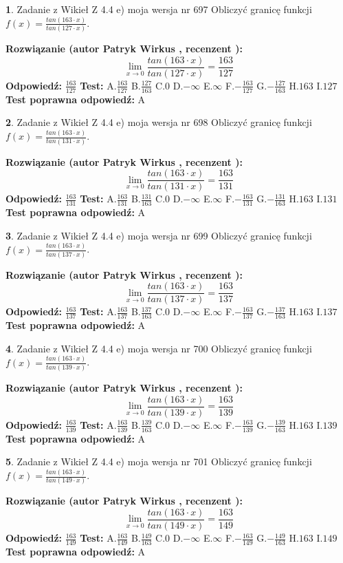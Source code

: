 \documentclass[12pt, a4paper]{article}
\theoremstyle{definition} %
\newtheorem{zad}{}
\newcommand{\zadStart}[1]{\begin{zad}#1\newline}
\newcommand{\zadStop}{\end{zad}}
\newcommand{\rozwStart}[2]{\noindent \textbf{Rozwiązanie (autor #1 , recenzent #2): }\newline}
\newcommand{\rozwStop}{\newline}
\newcommand{\odpStart}{\noindent \textbf{Odpowiedź:}\newline}
\newcommand{\odpStop}{\newline}
\newcommand{\testStart}{\noindent \textbf{Test:}\newline}
\newcommand{\testStop}{\newline}
\newcommand{\kluczStart}{\noindent \textbf{Test poprawna odpowiedź:}\newline}
\newcommand{\kluczStop}{\newline}
\begin{document}
\zadStart{Zadanie z Wikieł Z 4.4 e) moja wersja nr 697}
Obliczyć granicę funkcji $f(x)=\frac{tan(163\cdot x)}{tan(127\cdot x)}$.
\zadStop
\rozwStart{Patryk Wirkus}{}
$$\lim\limits_{x\to 0}\frac{tan(163\cdot x)}{tan(127\cdot x)}=
\frac{163}{127}$$
\rozwStop
\odpStart
$\frac{163}{127}$
\odpStop
\testStart
A.$\frac{163}{127}$
B.$\frac{127}{163}$
C.$0$
D.$-\infty$
E.$\infty$
F.$-\frac{163}{127}$
G.$-\frac{127}{163}$
H.$163$
I.$127$
\testStop
\kluczStart
A
\kluczStop



\zadStart{Zadanie z Wikieł Z 4.4 e) moja wersja nr 698}
Obliczyć granicę funkcji $f(x)=\frac{tan(163\cdot x)}{tan(131\cdot x)}$.
\zadStop
\rozwStart{Patryk Wirkus}{}
$$\lim\limits_{x\to 0}\frac{tan(163\cdot x)}{tan(131\cdot x)}=
\frac{163}{131}$$
\rozwStop
\odpStart
$\frac{163}{131}$
\odpStop
\testStart
A.$\frac{163}{131}$
B.$\frac{131}{163}$
C.$0$
D.$-\infty$
E.$\infty$
F.$-\frac{163}{131}$
G.$-\frac{131}{163}$
H.$163$
I.$131$
\testStop
\kluczStart
A
\kluczStop



\zadStart{Zadanie z Wikieł Z 4.4 e) moja wersja nr 699}
Obliczyć granicę funkcji $f(x)=\frac{tan(163\cdot x)}{tan(137\cdot x)}$.
\zadStop
\rozwStart{Patryk Wirkus}{}
$$\lim\limits_{x\to 0}\frac{tan(163\cdot x)}{tan(137\cdot x)}=
\frac{163}{137}$$
\rozwStop
\odpStart
$\frac{163}{137}$
\odpStop
\testStart
A.$\frac{163}{137}$
B.$\frac{137}{163}$
C.$0$
D.$-\infty$
E.$\infty$
F.$-\frac{163}{137}$
G.$-\frac{137}{163}$
H.$163$
I.$137$
\testStop
\kluczStart
A
\kluczStop



\zadStart{Zadanie z Wikieł Z 4.4 e) moja wersja nr 700}
Obliczyć granicę funkcji $f(x)=\frac{tan(163\cdot x)}{tan(139\cdot x)}$.
\zadStop
\rozwStart{Patryk Wirkus}{}
$$\lim\limits_{x\to 0}\frac{tan(163\cdot x)}{tan(139\cdot x)}=
\frac{163}{139}$$
\rozwStop
\odpStart
$\frac{163}{139}$
\odpStop
\testStart
A.$\frac{163}{139}$
B.$\frac{139}{163}$
C.$0$
D.$-\infty$
E.$\infty$
F.$-\frac{163}{139}$
G.$-\frac{139}{163}$
H.$163$
I.$139$
\testStop
\kluczStart
A
\kluczStop



\zadStart{Zadanie z Wikieł Z 4.4 e) moja wersja nr 701}
Obliczyć granicę funkcji $f(x)=\frac{tan(163\cdot x)}{tan(149\cdot x)}$.
\zadStop
\rozwStart{Patryk Wirkus}{}
$$\lim\limits_{x\to 0}\frac{tan(163\cdot x)}{tan(149\cdot x)}=
\frac{163}{149}$$
\rozwStop
\odpStart
$\frac{163}{149}$
\odpStop
\testStart
A.$\frac{163}{149}$
B.$\frac{149}{163}$
C.$0$
D.$-\infty$
E.$\infty$
F.$-\frac{163}{149}$
G.$-\frac{149}{163}$
H.$163$
I.$149$
\testStop
\kluczStart
A
\kluczStop
\end{document}
